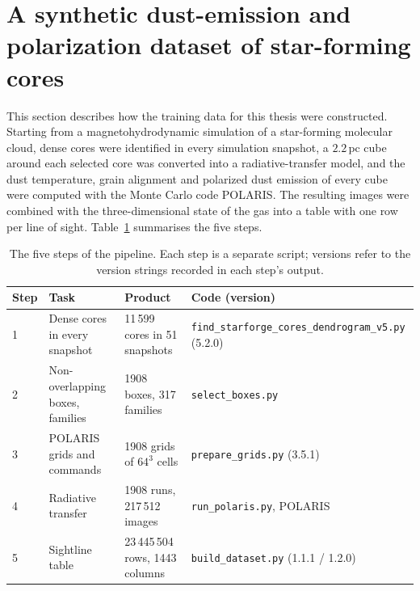 
\section{A synthetic dust-emission and polarization dataset of star-forming cores}
\label{sec:dataset}

This section describes how the training data for this thesis were constructed. Starting from a
magnetohydrodynamic simulation of a star-forming molecular cloud, dense cores were identified in every
simulation snapshot, a $2.2\,\mathrm{pc}$ cube around each selected core was converted into a radiative-transfer
model, and the dust temperature, grain alignment and polarized dust emission of every cube were computed with
the Monte Carlo code POLARIS. The resulting images were combined with the three-dimensional state of the gas
into a table with one row per line of sight. Table~\ref{tab:pipeline} summarises the five steps.

\begin{table}[ht]
  \centering
  \caption{The five steps of the pipeline. Each step is a separate script; versions refer to the
  version strings recorded in each step's output.}
  \label{tab:pipeline}
  \small
  \begin{tabular}{@{}llll@{}}
    \toprule
    Step & Task & Product & Code (version) \\
    \midrule
    1 & Dense cores in every snapshot   & 11\,599 cores in 51 snapshots & \texttt{find\_starforge\_cores\_dendrogram\_v5.py} (5.2.0) \\
    2 & Non-overlapping boxes, families & 1908 boxes, 317 families     & \texttt{select\_boxes.py} \\
    3 & POLARIS grids and commands      & 1908 grids of $64^3$ cells    & \texttt{prepare\_grids.py} (3.5.1) \\
    4 & Radiative transfer              & 1908 runs, 217\,512 images    & \texttt{run\_polaris.py}, POLARIS \\
    5 & Sightline table                 & 23\,445\,504 rows, 1443 columns & \texttt{build\_dataset.py} (1.1.1 / 1.2.0) \\
    \bottomrule
  \end{tabular}
\end{table}

